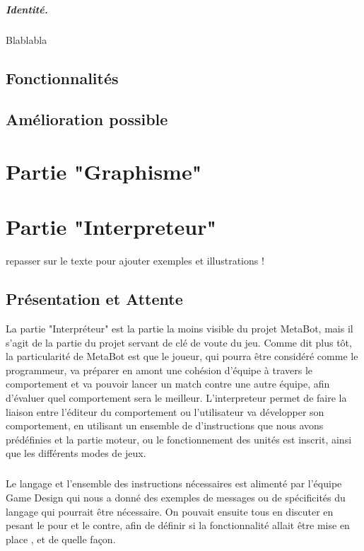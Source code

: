 \documentclass{report}
\begin{document}
\paragraph{Identité.}
Blablabla
\section{Fonctionnalités}
\section{Amélioration possible}

\newpage
\chapter{Partie "Graphisme"}

\newpage
\chapter{Partie "Interpreteur"}
repasser sur le texte pour ajouter exemples et illustrations ! 
\section{Présentation et Attente}
La partie "Interpréteur" est la partie la moins visible du projet MetaBot,
mais il s'agit de la partie du projet servant de clé de voute du jeu.
Comme dit plus tôt, la particularité de MetaBot est que le joueur, qui pourra être considéré comme le programmeur, va préparer en amont une cohésion d'équipe à travers le comportement et va pouvoir lancer un match contre une autre équipe, afin d'évaluer quel comportement sera le meilleur.
L'interpreteur permet de faire la liaison entre l'éditeur du comportement ou l'utilisateur va développer son comportement, en utilisant un ensemble de d'instructions que nous avons prédéfinies  et la partie moteur, ou le fonctionnement des unités est inscrit, ainsi que les différents modes de jeux.
\paragraph{}
Le langage et l'ensemble des instructions nécessaires est alimenté par l'équipe Game Design qui nous a donné des exemples de messages ou de spécificités du langage qui pourrait être nécessaire. On pouvait ensuite tous en discuter en pesant le pour et le contre, afin de définir si la fonctionnalité allait être mise en place , et de quelle façon.
\end{document}
